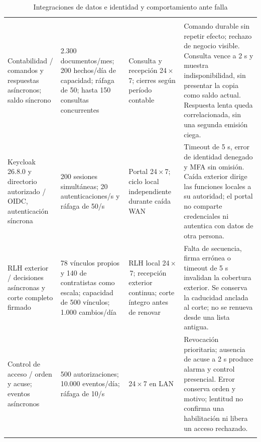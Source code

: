 \begingroup
\setlength{\tabcolsep}{3pt}
\begin{longtable}{@{}L{.19\textwidth}L{.26\textwidth}L{.20\textwidth}L{\dimexpr.35\textwidth-18pt\relax}@{}}
\caption{Integraciones de datos e identidad y comportamiento ante falla}\label{tab:sd5_integraciones_cierre}\\\hline
{} &  &  &  \\\hline\endfirsthead
\hline{} &  &  &  \\\hline\endhead
Contabilidad / comandos y respuestas asíncronos; saldo síncrono & 2.300 documentos/mes; 200 hechos/día de capacidad; ráfaga de 50; hasta 150 consultas concurrentes & Consulta y recepción 24\,$\times$\,7; cierres según período contable & Comando durable sin repetir efecto; rechazo de negocio visible. Consulta vence a 2 s y muestra indisponibilidad, sin presentar la copia como saldo actual. Respuesta lenta queda correlacionada, sin una segunda emisión ciega. \\\addlinespace\hline
Keycloak 26.8.0 y directorio autorizado / OIDC, autenticación síncrona & 200 sesiones simultáneas; 20 autenticaciones/s y ráfaga de 50/s & Portal 24\,$\times$\,7; ciclo local independiente durante caída WAN & Timeout de 5 s, error de identidad denegado y MFA sin omisión. Caída exterior dirige las funciones locales a su autoridad; el portal no comparte credenciales ni autentica con datos de otra persona. \\\addlinespace\hline
RLH exterior / decisiones asíncronas y corte completo firmado & 78 vínculos propios y 140 de contratistas como escala; capacidad de 500 vínculos; 1.000 cambios/día & RLH local 24\,$\times$\,7; recepción exterior continua; corte íntegro antes de renovar & Falta de secuencia, firma errónea o timeout de 5 s invalidan la cobertura exterior. Se conserva la caducidad anclada al corte; no se renueva desde una lista antigua. \\\addlinespace\hline
Control de acceso / orden y acuse; eventos asíncronos & 500 autorizaciones; 10.000 eventos/día; ráfaga de 10/s & 24\,$\times$\,7 en LAN & Revocación prioritaria; ausencia de acuse a 2 s produce alarma y control presencial. Error conserva orden y motivo; lentitud no confirma una habilitación ni libera un acceso rechazado. \\\addlinespace\hline

\end{longtable}
